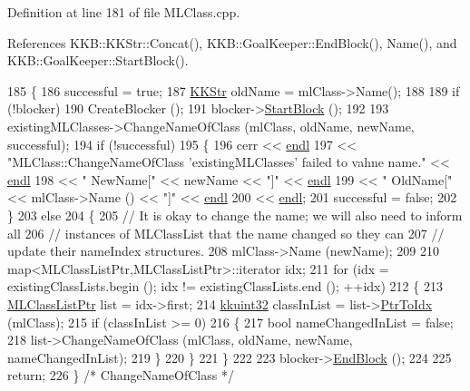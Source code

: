 Definition at line 181 of file M\+L\+Class.\+cpp.



References K\+K\+B\+::\+K\+K\+Str\+::\+Concat(), K\+K\+B\+::\+Goal\+Keeper\+::\+End\+Block(), Name(), and K\+K\+B\+::\+Goal\+Keeper\+::\+Start\+Block().


\begin{DoxyCode}
185 \{
186   successful = \textcolor{keyword}{true};
187   \hyperlink{class_k_k_b_1_1_k_k_str}{KKStr}  oldName = mlClass->Name();
188 
189   \textcolor{keywordflow}{if}  (!blocker)
190     CreateBlocker ();
191   blocker->\hyperlink{class_k_k_b_1_1_goal_keeper_a2a9565f88cee7b4339c24ed4d5155419}{StartBlock} ();
192 
193   existingMLClasses->ChangeNameOfClass (mlClass, oldName, newName, successful);
194   \textcolor{keywordflow}{if}  (!successful)
195   \{
196     cerr << \hyperlink{namespace_k_k_b_ad1f50f65af6adc8fa9e6f62d007818a8}{endl} 
197          << \textcolor{stringliteral}{"MLClass::ChangeNameOfClass   'existingMLClasses'  failed to vahne name."} << 
      \hyperlink{namespace_k_k_b_ad1f50f65af6adc8fa9e6f62d007818a8}{endl}
198          << \textcolor{stringliteral}{"                        NewName["} << newName << \textcolor{stringliteral}{"]"} << \hyperlink{namespace_k_k_b_ad1f50f65af6adc8fa9e6f62d007818a8}{endl}
199          << \textcolor{stringliteral}{"                        OldName["} << mlClass->Name () << \textcolor{stringliteral}{"]"} << 
      \hyperlink{namespace_k_k_b_ad1f50f65af6adc8fa9e6f62d007818a8}{endl}
200          << \hyperlink{namespace_k_k_b_ad1f50f65af6adc8fa9e6f62d007818a8}{endl};
201     successful = \textcolor{keyword}{false};
202   \}
203   \textcolor{keywordflow}{else}
204   \{
205     \textcolor{comment}{// It is okay to change the name;  we will also need to inform all }
206     \textcolor{comment}{// instances of MLClassList that the name changed so they can }
207     \textcolor{comment}{// update their nameIndex structures.}
208     mlClass->Name (newName);
209 
210     map<MLClassListPtr,MLClassListPtr>::iterator  idx;
211     \textcolor{keywordflow}{for}  (idx = existingClassLists.begin ();  idx != existingClassLists.end ();  ++idx)
212   \{
213       \hyperlink{class_k_k_m_l_l_1_1_m_l_class_list}{MLClassListPtr}  list = idx->first;
214       \hyperlink{namespace_k_k_b_af8d832f05c54994a1cce25bd5743e19a}{kkuint32} classInList = list->\hyperlink{class_k_k_b_1_1_k_k_queue_ac7c26abdf599669a4b0898534f735f99}{PtrToIdx} (mlClass);
215       \textcolor{keywordflow}{if}  (classInList >= 0)
216       \{
217         \textcolor{keywordtype}{bool}  nameChangedInList = \textcolor{keyword}{false};
218         list->ChangeNameOfClass (mlClass, oldName, newName, nameChangedInList);
219       \}
220     \}
221   \}
222 
223   blocker->\hyperlink{class_k_k_b_1_1_goal_keeper_aee88d11d3466dd77ef3e5b18c87e27fb}{EndBlock} ();
224 
225   \textcolor{keywordflow}{return};
226 \}  \textcolor{comment}{/* ChangeNameOfClass */}
\end{DoxyCode}
